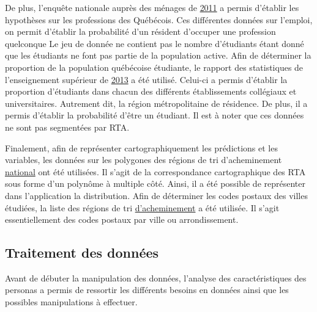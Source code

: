 \documentclass[11pt,french]{article}\usepackage[]{graphicx}\usepackage[]{color}
\begin{document}
De plus, l'enquête nationale auprès des ménages de \href{http://www12.statcan.gc.ca/nhs-enm/2011/dp-pd/dt-td/Rp-fra.cfm?TABID=2&LANG=F&A=R&APATH=3&DETAIL=0&DIM=0&FL=A&FREE=0&GC=24&GL=-1&GID=1118301&GK=1&GRP=1&O=D&PID=106042&PRID=0&PTYPE=105277&S=0&SHOWALL=0&SUB=0&Temporal=2013&THEME=96&VID=0&VNAMEE=&VNAMEF=&D1=2&D2=0&D3=0&D4=0&D5=0&D6=0}{2011} a permis d'établir les hypothèses sur les professions des Québécois. Ces différentes données sur l'emploi, on permit d'établir la probabilité d'un résident d'occuper une profession quelconque Le jeu de donnée ne contient pas le nombre d'étudiants étant donné que les étudiants ne font pas partie de la population active. Afin de déterminer la proportion de la population québécoise étudiante, le rapport des statistiques de l'enseignement supérieur de \href{http://www.education.gouv.qc.ca/fileadmin/administration/librairies/documents/Ministere/acces_info/Statistiques/Statistiques_ES/Statistiques_enseignement_superieur_2013.pdf}{2013} a été utilisé. Celui-ci a permis d'établir la proportion d'étudiants dans chacun des différents établissements collégiaux et universitaires. Autrement dit, la région métropolitaine de résidence. De plus, il a permis d'établir la probabilité d'être un étudiant. Il est à noter que ces données ne sont pas segmentées par RTA.
\newline

Finalement, afin de représenter cartographiquement les prédictions et les variables, les données sur les polygones des régions de tri d'acheminement \href{http://www12.statcan.gc.ca/census-recensement/2011/geo/bound-limit/bound-limit-2016-fra.cfm}{national} ont été utilisées. Il s'agit de la correspondance cartographique des RTA sous forme d'un polynôme à multiple côté. Ainsi, il a été possible de représenter dans l'application la distribution. Afin de déterminer les codes postaux des villes étudiées, la liste des régions de tri \href{https://fr.wikipedia.org/wiki/Liste_des_codes_postaux_canadiens_débutant_par_J}{d'acheminement} a été utilisée. Il s'agit essentiellement des codes postaux par ville ou arrondissement.


\subsection*{Traitement des données}

Avant de débuter la manipulation des données, l'analyse des caractéristiques des personas a permis de ressortir les différents besoins en données ainsi que les possibles manipulations à effectuer. 
\end{document}
